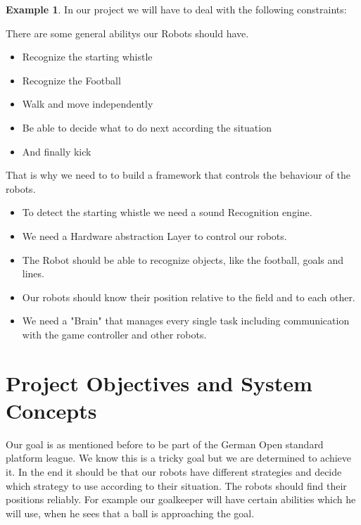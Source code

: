 \documentclass[12pt]{article}
\theoremstyle{definition}
\newtheorem{example}{Example}
\newenvironment{explanation}{%
   \setlength{\parindent}{0pt}
   \itshape
   \color{blue}
}{}
\begin{document}
\begin{example}
In our project we will have to deal with the following constraints:

There are some general abilitys our Robots should have.
\begin{itemize}
	\item Recognize the starting whistle
	\item Recognize the Football
	\item Walk and move independently
	\item Be able to decide what to do next according the situation
	\item And finally kick 
\end{itemize}

That is why we need to to build a framework that controls the behaviour of the robots.

\begin{itemize}
\item To detect the starting whistle we need a sound Recognition engine.
\item We need a Hardware abstraction Layer to control our robots.
\item The Robot should be able to recognize objects, like the football, goals and lines.
\item Our robots should know their position relative to the field and to each other.
\item We need a "Brain" that manages every single task including communication with the game controller and other robots.

\end{itemize}
\end{example}

\pagebreak

\section{Project Objectives and System Concepts}
\begin{explanation}
Our goal is as mentioned before to be part of the German Open standard platform league. We know this is a tricky goal but we are determined to achieve it. In the end it should be that our robots have different strategies and decide which strategy to use according to their situation. The robots should find their positions reliably. For example our goalkeeper will have certain abilities which he will use, when he sees that a ball is approaching the goal. 
\end{explanation}
\end{document}
